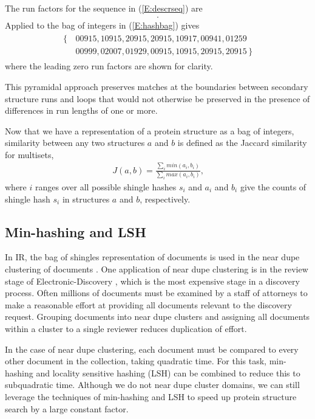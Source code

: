 \documentclass[letter,center,fleqn]{NAR}
\begin{document}
The run factors for the sequence in (\ref{E:descrseq}) are
\begin{align}
    [\, 0, 1, 2, 2, 1, 0, 0, 0, 0, 0, 0, 1, 2, 2, 1, 0 \,].
\end{align}
Applied to the bag of integers in (\ref{E:hashbag}) gives
\begin{align}\label{E:rpebag}
    \begin{split}
    \{\,&00915, 10915, 20915, 20915, 10917, 00941, 01259 \\
        &00999, 02007, 01929, 00915, 10915, 20915, 20915 \,\}
    \end{split}
\end{align}
where the leading zero run factors are shown for clarity. 

This pyramidal approach preserves matches at the boundaries between secondary structure runs and loops that would not otherwise be preserved in the presence of differences in run lengths of one or more. 

Now that we have a representation of a protein structure as a bag of integers, similarity between any two structures $a$ and $b$ is defined as the Jaccard similarity \cite{Levan1971} for multisets,
\begin{align}
    J(a,b) = \frac{\sum_i min(a_i, b_i)}{\sum_i max(a_i,b_i)}\text{,}
\end{align}
where $i$ ranges over all possible shingle hashes $s_i$ and $a_i$ and $b_i$ give the counts of shingle hash $s_i$ in structures $a$ and $b$, respectively. 

\subsection{Min-hashing and LSH}

In IR, the bag of shingles representation of documents is used in the near dupe clustering of documents \cite{Broder1997b}.
One application of near dupe clustering is in the review stage of Electronic-Discovery \cite{Joshi2008}, which is the most expensive stage in a discovery process. 
Often millions of documents must be examined by a staff of attorneys to make a reasonable effort at providing all documents relevant to the discovery request. 
Grouping documents into near dupe clusters and assigning all documents within a cluster to a single reviewer reduces duplication of effort. 

In the case of near dupe clustering, each document must be compared to every other document in the collection, taking quadratic time.
For this task, min-hashing \cite{Broder1998} and locality sensitive hashing (LSH) \cite{Indyk1998} can be combined to reduce this to subquadratic time. 
Although we do not near dupe cluster domains, we can still leverage the techniques of min-hashing and LSH to speed up protein structure search by a large constant factor.
\end{document}
